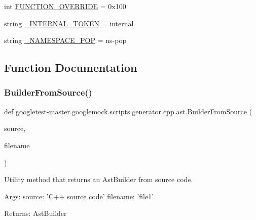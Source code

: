 \begin{DoxyCompactItemize}
\item 
int \mbox{\hyperlink{namespacegoogletest-master_1_1googlemock_1_1scripts_1_1generator_1_1cpp_1_1ast_a9c16f7cb37a67b9647d0168f313fe338}{F\+U\+N\+C\+T\+I\+O\+N\+\_\+\+O\+V\+E\+R\+R\+I\+DE}} = 0x100
\item 
string \mbox{\hyperlink{namespacegoogletest-master_1_1googlemock_1_1scripts_1_1generator_1_1cpp_1_1ast_a648755cf58684fc08b81201e290eaf70}{\+\_\+\+I\+N\+T\+E\+R\+N\+A\+L\+\_\+\+T\+O\+K\+EN}} = \textquotesingle{}internal\textquotesingle{}
\item 
string \mbox{\hyperlink{namespacegoogletest-master_1_1googlemock_1_1scripts_1_1generator_1_1cpp_1_1ast_abd780ce430bb27a3ecd1990ce7ceecef}{\+\_\+\+N\+A\+M\+E\+S\+P\+A\+C\+E\+\_\+\+P\+OP}} = \textquotesingle{}ns-\/pop\textquotesingle{}
\end{DoxyCompactItemize}


\subsection{Function Documentation}
\mbox{\label{namespacegoogletest-master_1_1googlemock_1_1scripts_1_1generator_1_1cpp_1_1ast_adcd0774157b12ae0b5909027f94f42db}} 
\subsubsection{\texorpdfstring{BuilderFromSource()}{BuilderFromSource()}}
{\footnotesize\ttfamily def googletest-\/master.\+googlemock.\+scripts.\+generator.\+cpp.\+ast.\+Builder\+From\+Source (\begin{DoxyParamCaption}\item[{}]{source,  }\item[{}]{filename }\end{DoxyParamCaption})}

\begin{DoxyVerb}Utility method that returns an AstBuilder from source code.

Args:
  source: 'C++ source code'
  filename: 'file1'

Returns:
  AstBuilder
\end{DoxyVerb}
 \mbox{\label{namespacegoogletest-master_1_1googlemock_1_1scripts_1_1generator_1_1cpp_1_1ast_a5e6b4b1ad5f93de0fb81309194ed4e1c}} 
